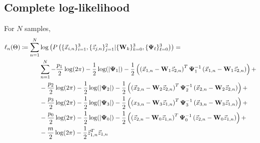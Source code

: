 \begin{landscape}
\section{Complete log-likelihood}
For $N$ samples, 
\begin{equation}
\begin{split}
\ell_n(\Theta) \coloneqq \sum_{n=1}^N & \log  \left( P \left( \{\vec{x}_{i,n}\}_{i=1}^3,\{ \vec{z}_{j,n}\}_{j=1}^2| \{\bold{W}_k\}_{k=0}^3, \{\bold{\Psi}_{\ell}\}_{\ell=0}^3 \right) \right) = \\
&\sum_{n=1}^N -\frac{p_1}{2} \log (2 \pi) - \frac{1}{2} \log(|\bold{\Psi}_1|) -
\frac{1}{2} \left( \left( \vec{x}_{1,n} - \bold{W}_1 \vec{z}_{2,n} \right)^T \bold{\Psi}_1^{-1} \left(
    \vec{x}_{1,n} - \bold{W}_1 \vec{z}_{2,n} \right) \right) + \\
& -\frac{p_2}{2} \log (2 \pi) - \frac{1}{2} \log(|\bold{\Psi}_2|) -
\frac{1}{2} \left( \left( \vec{x}_{2,n} - \bold{W}_2 \vec{z}_{2,n} \right)^T \bold{\Psi}_2^{-1} \left(
    \vec{x}_{2,n} - \bold{W}_2 \vec{z}_{2,n} \right) \right) + \\
& -\frac{p_3}{2} \log (2 \pi) - \frac{1}{2} \log(|\bold{\Psi}_3|) -
\frac{1}{2} \left( \left( x_{3,n} - \bold{W}_3 \vec{z}_{1,n} \right)^T \bold{\Psi}_3^{-1} \left(
    \vec{x}_{3,n} - \bold{W}_3 \vec{z}_{1,n} \right) \right) + \\
& -\frac{p_0}{2} \log (2 \pi) - \frac{1}{2} \log(|\bold{\Psi}_0|) -
\frac{1}{2} \left( \left( \vec{z}_{2,n} - \bold{W}_0 \vec{z}_{1,n} \right)^T \bold{\Psi}_0^{-1} \left(
    \vec{z}_{2,n} - \bold{W}_0 \vec{z}_{1,n} \right) \right) + \\
& -\frac{m}{2} \log (2 \pi) - \frac{1}{2} \vec{z}_{1,n}^T \vec{z}_{1,n} 
\end{split}
\end{equation}




\end{landscape}
